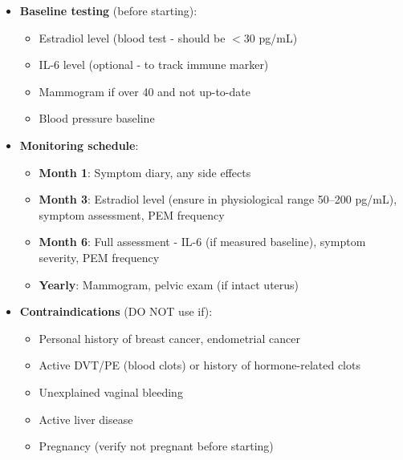 \begin{itemize}
\begin{itemize}
        \item \textbf{First application can be TONIGHT} (if prescription obtained):
        \begin{itemize}
            \item Apply estradiol patch to skin
            \item Take progesterone at bedtime
            \item Continue daily/weekly as scheduled
        \end{itemize}
    \end{itemize}

    \item \textbf{Baseline testing} (before starting):
    \begin{itemize}
        \item Estradiol level (blood test - should be $<$30 pg/mL)
        \item IL-6 level (optional - to track immune marker)
        \item Mammogram if over 40 and not up-to-date
        \item Blood pressure baseline
    \end{itemize}

    \item \textbf{Monitoring schedule}:
    \begin{itemize}
        \item \textbf{Month 1}: Symptom diary, any side effects
        \item \textbf{Month 3}: Estradiol level (ensure in physiological range 50--200 pg/mL), symptom assessment, PEM frequency
        \item \textbf{Month 6}: Full assessment - IL-6 (if measured baseline), symptom severity, PEM frequency
        \item \textbf{Yearly}: Mammogram, pelvic exam (if intact uterus)
    \end{itemize}

    \item \textbf{Contraindications} (DO NOT use if):
    \begin{itemize}
        \item Personal history of breast cancer, endometrial cancer
        \item Active DVT/PE (blood clots) or history of hormone-related clots
        \item Unexplained vaginal bleeding
        \item Active liver disease
        \item Pregnancy (verify not pregnant before starting)
    \end{itemize}
\end{itemize}

